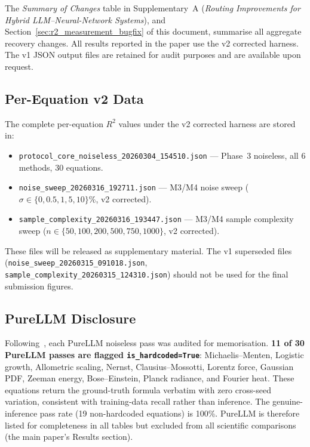 \documentclass[twoside,11pt]{article}
\begin{document}
The \emph{Summary of Changes} table in Supplementary~A (\emph{Routing Improvements for Hybrid LLM--Neural-Network Systems}), and Section~\ref{sec:r2_measurement_bugfix} of this document, summarise all
aggregate recovery changes. All results reported in the paper use the
v2 corrected harness. The v1 JSON output files are retained for audit
purposes and are available upon request.

\subsection*{Per-Equation v2 Data}

The complete per-equation $R^2$ values under the v2 corrected harness are
stored in:
\begin{itemize}
  \item \texttt{protocol\_core\_noiseless\_20260304\_154510.json} —
    Phase~3 noiseless, all 6 methods, 30 equations.
  \item \texttt{noise\_sweep\_20260316\_192711.json} —
    M3/M4 noise sweep ($\sigma \in \{0, 0.5, 1, 5, 10\}\%$, v2 corrected).
  \item \texttt{sample\_complexity\_20260316\_193447.json} —
    M3/M4 sample complexity sweep ($n \in \{50, 100, 200, 500, 750, 1000\}$,
    v2 corrected).
\end{itemize}
These files will be released as supplementary material. The v1 superseded
files (\texttt{noise\_sweep\_20260315\_091018.json},
\texttt{sample\_complexity\_20260315\_124310.json}) should not be used
for the final submission figures.

\subsection*{PureLLM Disclosure}

Following~\citet{memorization2024audit}, each PureLLM noiseless pass
was audited for memorisation. \textbf{11 of 30 PureLLM passes are
flagged \texttt{is\_hardcoded=True}}: Michaelis--Menten, Logistic growth,
Allometric scaling, Nernst, Clausius--Mossotti, Lorentz force, Gaussian PDF,
Zeeman energy, Bose--Einstein, Planck radiance, and Fourier heat. These
equations return the ground-truth formula verbatim with zero cross-seed
variation, consistent with training-data recall rather than inference.
The genuine-inference pass rate (19 non-hardcoded equations) is 100\%.
PureLLM is therefore listed for completeness in all tables but excluded
from all scientific comparisons (the main paper's Results section).
\end{document}
